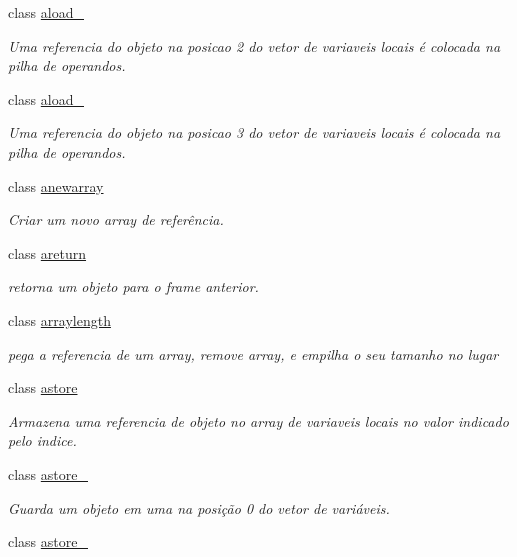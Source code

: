 \begin{DoxyCompactItemize}
class \hyperlink{class_instruction_impl_1_1aload__2}{aload\+\_}
\begin{DoxyCompactList}\small\item\em Uma referencia do objeto na posicao 2 do vetor de variaveis locais é colocada na pilha de operandos. \end{DoxyCompactList}\item 
class \hyperlink{class_instruction_impl_1_1aload__3}{aload\+\_}
\begin{DoxyCompactList}\small\item\em Uma referencia do objeto na posicao 3 do vetor de variaveis locais é colocada na pilha de operandos. \end{DoxyCompactList}\item 
class \hyperlink{class_instruction_impl_1_1anewarray}{anewarray}
\begin{DoxyCompactList}\small\item\em Criar um novo array de referência. \end{DoxyCompactList}\item 
class \hyperlink{class_instruction_impl_1_1areturn}{areturn}
\begin{DoxyCompactList}\small\item\em retorna um objeto para o frame anterior. \end{DoxyCompactList}\item 
class \hyperlink{class_instruction_impl_1_1arraylength}{arraylength}
\begin{DoxyCompactList}\small\item\em pega a referencia de um array, remove array, e empilha o seu tamanho no lugar \end{DoxyCompactList}\item 
class \hyperlink{class_instruction_impl_1_1astore}{astore}
\begin{DoxyCompactList}\small\item\em Armazena uma referencia de objeto no array de variaveis locais no valor indicado pelo indice. \end{DoxyCompactList}\item 
class \hyperlink{class_instruction_impl_1_1astore__0}{astore\+\_}
\begin{DoxyCompactList}\small\item\em Guarda um objeto em uma na posição 0 do vetor de variáveis. \end{DoxyCompactList}\item 
class \hyperlink{class_instruction_impl_1_1astore__1}{astore\+\_}

\end{DoxyCompactItemize}
